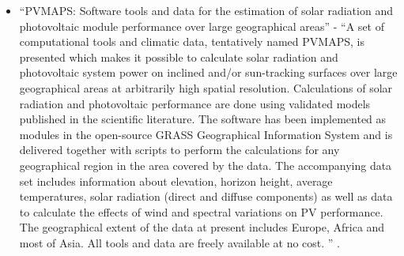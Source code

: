 \documentclass[conference, a4paper]{IEEEtran}
\begin{document}
\begin{itemize}
\item ``PVMAPS: Software tools and data for the estimation of solar radiation and photovoltaic module performance over large geographical areas'' - ``A set of computational tools and climatic data, tentatively named PVMAPS, is presented which makes it possible to calculate solar radiation and photovoltaic system power on inclined and/or sun-tracking surfaces over large geographical areas at arbitrarily high spatial resolution. Calculations of solar radiation and photovoltaic performance are done using validated models published in the scientific literature. The software has been implemented as modules in the open-source GRASS Geographical Information System and is delivered together with scripts to perform the calculations for any geographical region in the area covered by the data. The accompanying data set includes information about elevation, horizon height, average temperatures, solar radiation (direct and diffuse components) as well as data to calculate the effects of wind and spectral variations on PV performance. The geographical extent of the data at present includes Europe, Africa and most of Asia. All tools and data are freely available at no cost. '' \cite{huld-2017}.


\end{itemize}
\end{document}
